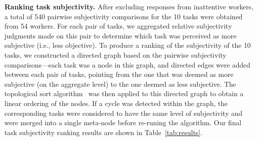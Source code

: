 \noindent \textbf{Ranking task subjectivity.}
After excluding responses from inattentive workers, a total of 540 pairwise subjectivity comparisons for the 10 tasks were obtained from 54 workers. For each pair of tasks, we aggregated relative subjectivity judgments made on this pair to determine which task was perceived as more subjective (i.e., less objective). To produce a ranking of the  subjectivity of the 10 tasks, we constructed a directed graph based on the pairwise subjectivity comparisons---each task was a node in this graph, and directed edges were added between each pair of tasks, pointing from the one that was deemed as more subjective (on the aggregate level) to the one deemed as less subjective. 
The topological sort algorithm~\cite{cormen2022introduction} was then applied to this directed graph to obtain a linear ordering of the nodes. If a cycle was detected within the graph, the corresponding tasks were considered to have the same level of subjectivity
and were merged into a single meta-node before re-runing the algorithm. 
Our final task subjectivity ranking results are shown in  Table~\ref{tab:results}.


